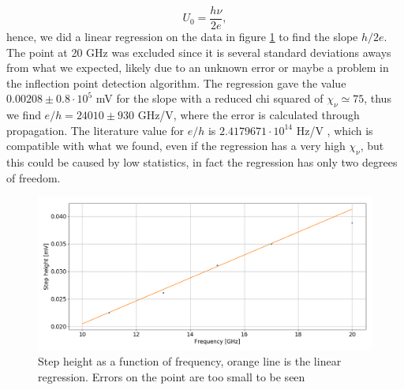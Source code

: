 \documentclass[a4paper,10pt]{article}
\begin{document}
\begin{equation}U_0 = \frac{h\nu}{2e},\end{equation}
hence, we did a linear regression on the data in figure \ref{eh} to find the slope $h/2e$. The point at 20 GHz was excluded since it is several standard deviations aways from what we expected, likely due to an unknown error or maybe a problem in the inflection point detection algorithm. The regression gave the value $0.00208\pm 0.8\cdot 10^5$ mV for the slope with a reduced chi squared of $\chi_\nu \simeq 75$, thus we find $e/h = 24010 \pm 930$ GHz/V, where the error is calculated through propagation. The literature value for $e/h$ is $ 2.4179671\cdot 10^{14}$ Hz/V \cite{skriptum}, which is compatible with what we found, even if the regression has a very high $\chi_\nu$, but this could be caused by low statistics, in fact the regression has only two degrees of freedom.
\begin{figure}[H]
\centering
\includegraphics[width = \textwidth]{eh}
\caption{Step height as a function of frequency, orange line is the linear regression. Errors on the point are too small to be seen}\label{eh}
\end{figure}
\end{document}
